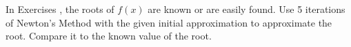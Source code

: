 {\noindent In Exercises}
{, the roots of $f(x)$ are known or are easily found. Use 5 iterations of Newton's Method with the given initial approximation to approximate the root. Compare it to the known value of the root.
}
